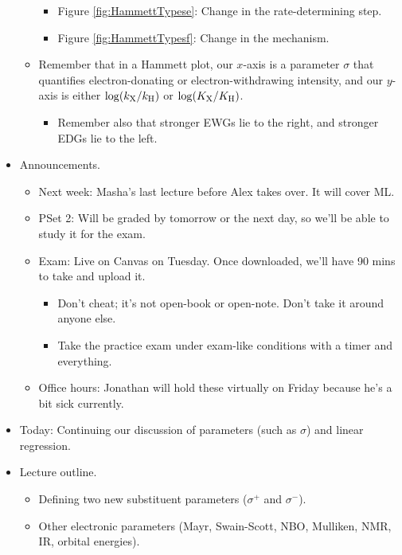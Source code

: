 \documentclass[../notes.tex]{subfiles}
\begin{document}
\begin{itemize}
\begin{itemize}
\begin{itemize}
            \item Figure \ref{fig:HammettTypese}: Change in the rate-determining step.
            \item Figure \ref{fig:HammettTypesf}: Change in the mechanism.
        \end{itemize}
        \item Remember that in a Hammett plot, our $x$-axis is a parameter $\sigma$ that quantifies electron-donating or electron-withdrawing intensity, and our $y$-axis is either $\log(k_{\ce{X}}/k_{\ce{H}})$ or $\log(K_{\ce{X}}/K_{\ce{H}})$.
        \begin{itemize}
            \item Remember also that stronger EWGs lie to the right, and stronger EDGs lie to the left.
        \end{itemize}
    \end{itemize}
    \item Announcements.
    \begin{itemize}
        \item Next week: Masha's last lecture before Alex takes over. It will cover ML.
        \item PSet 2: Will be graded by tomorrow or the next day, so we'll be able to study it for the exam.
        \item Exam: Live on Canvas on Tuesday. Once downloaded, we'll have 90 mins to take and upload it.
        \begin{itemize}
            \item Don't cheat; it's not open-book or open-note. Don't take it around anyone else.
            \item Take the practice exam under exam-like conditions with a timer and everything.
        \end{itemize}
        \item Office hours: Jonathan will hold these virtually on Friday because he's a bit sick currently.
    \end{itemize}
    \item Today: Continuing our discussion of parameters (such as $\sigma$) and linear regression.
    \item Lecture outline.
    \begin{itemize}
        \item Defining two new substituent parameters ($\sigma^+$ and $\sigma^-$).
        \item Other electronic parameters (Mayr, Swain-Scott, NBO, Mulliken, NMR, IR, orbital energies).

\end{itemize}
\end{itemize}
\end{document}
